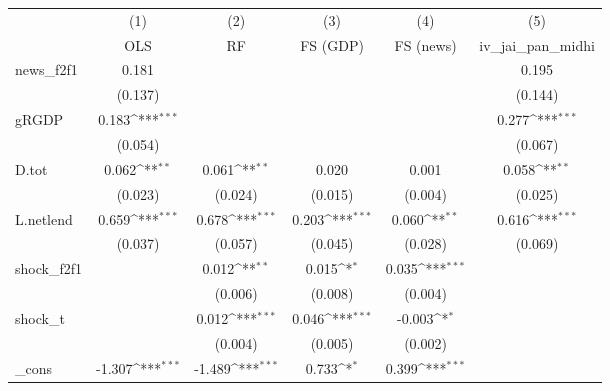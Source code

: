 {
\def\sym#1{\ifmmode^{#1}\else\(^{#1}\)\fi}
\begin{tabular}{l*{5}{c}}
\toprule
            &\multicolumn{1}{c}{(1)}&\multicolumn{1}{c}{(2)}&\multicolumn{1}{c}{(3)}&\multicolumn{1}{c}{(4)}&\multicolumn{1}{c}{(5)}\\
            &\multicolumn{1}{c}{OLS}&\multicolumn{1}{c}{RF}&\multicolumn{1}{c}{FS (GDP)}&\multicolumn{1}{c}{FS (news)}&\multicolumn{1}{c}{iv\_jai\_pan\_midhi}\\
\midrule
news\_f2f1   &       0.181         &                     &                     &                     &       0.195         \\
            &     (0.137)         &                     &                     &                     &     (0.144)         \\
\addlinespace
gRGDP       &       0.183\sym{***}&                     &                     &                     &       0.277\sym{***}\\
            &     (0.054)         &                     &                     &                     &     (0.067)         \\
\addlinespace
D.tot       &       0.062\sym{**} &       0.061\sym{**} &       0.020         &       0.001         &       0.058\sym{**} \\
            &     (0.023)         &     (0.024)         &     (0.015)         &     (0.004)         &     (0.025)         \\
\addlinespace
L.netlend   &       0.659\sym{***}&       0.678\sym{***}&       0.203\sym{***}&       0.060\sym{**} &       0.616\sym{***}\\
            &     (0.037)         &     (0.057)         &     (0.045)         &     (0.028)         &     (0.069)         \\
\addlinespace
shock\_f2f1  &                     &       0.012\sym{**} &       0.015\sym{*}  &       0.035\sym{***}&                     \\
            &                     &     (0.006)         &     (0.008)         &     (0.004)         &                     \\
\addlinespace
shock\_t     &                     &       0.012\sym{***}&       0.046\sym{***}&      -0.003\sym{*}  &                     \\
            &                     &     (0.004)         &     (0.005)         &     (0.002)         &                     \\
\addlinespace
\_cons      &      -1.307\sym{***}&      -1.489\sym{***}&       0.733\sym{*}  &       0.399\sym{***}&                     \\

\end{tabular}}
